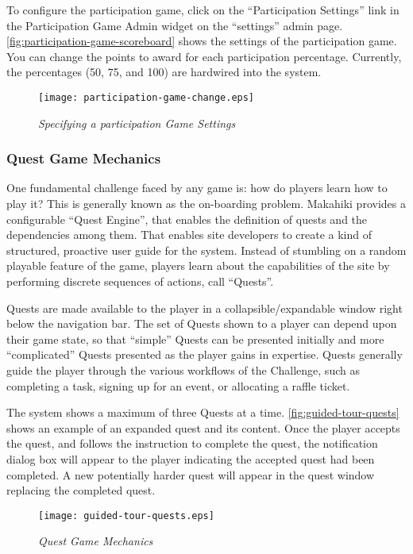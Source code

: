 To configure the participation game, click on the ``Participation Settings'' link in the Participation Game Admin widget on the ``settings'' admin page. \autoref{fig:participation-game-scoreboard} shows the settings of the participation game. You can change the points to award for each participation percentage. Currently, the percentages (50, 75, and 100) are hardwired into the system.

\begin{figure}[!ht]
  \center
  \texttt{[image: participation-game-change.eps]}
  \caption{\em Specifying a participation Game Settings}
  \label{fig:participation-game-change}
\end{figure}

\subsubsection{Quest Game Mechanics}
One fundamental challenge faced by any game is: how do players learn how to play it? This is generally known as the on-boarding problem. Makahiki provides a configurable ``Quest Engine'', that enables the definition of quests and the dependencies among them. That enables site developers to create a kind of structured, proactive user guide for the system. Instead of stumbling on a random playable feature of the game, players learn about the capabilities of the site by performing discrete sequences of actions, call ``Quests''. 

Quests are made available to the player in a collapsible/expandable window right below the navigation bar. The set of Quests shown to a player can depend upon their game state, so that ``simple'' Quests can be presented initially and more ``complicated'' Quests presented as the player gains in expertise. Quests generally guide the player through the various workflows of the Challenge, such as completing a task, signing up for an event, or allocating a raffle ticket.

The system shows a maximum of three Quests at a time. \autoref{fig:guided-tour-quests} shows an example of an expanded quest and its content. Once the player accepts the quest, and follows the instruction to complete the quest, the notification dialog box will appear to the player indicating the accepted quest had been completed. A new potentially harder quest will appear in the quest window replacing the completed quest.

\begin{figure}[!ht]
  \center
  \texttt{[image: guided-tour-quests.eps]}
  \caption{\em Quest Game Mechanics}
  \label{fig:guided-tour-quests}
\end{figure}

